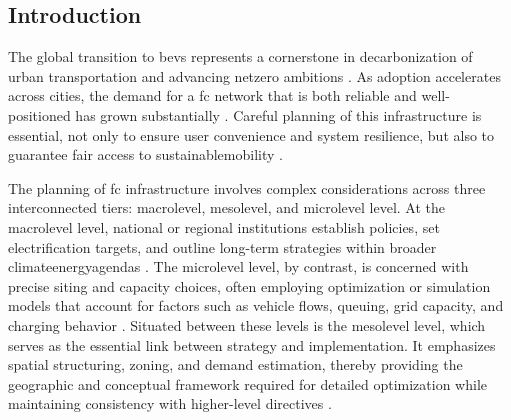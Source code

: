 \subsection{Introduction}
The global transition to \glspl{bev} represents a cornerstone in \gls{decarbonization} of urban transportation and advancing \gls{netzero} ambitions \cite{IEA2023GlobalEVOutlook}. As adoption accelerates across cities, the demand for a \gls{fc} network that is both reliable and well-positioned has grown substantially \cite{Ghosh2022}. Careful planning of this infrastructure is essential, not only to ensure user convenience and system resilience, but also to guarantee fair access to \gls{sustainablemobility} \cite{Cai2024}.


The planning of \gls{fc} infrastructure involves complex considerations across three interconnected tiers: \gls{macrolevel}, \gls{mesolevel}, and \gls{microlevel} level. At the \gls{macrolevel} level, national or regional institutions establish policies, set electrification targets, and outline long-term strategies within broader \gls{climateenergyagendas} \cite{Luo2024}. The \gls{microlevel} level, by contrast, is concerned with precise siting and capacity choices, often employing optimization or simulation models that account for factors such as vehicle flows, queuing, grid capacity, and charging behavior \cite{Metais2022}. Situated between these levels is the \gls{mesolevel} level, which serves as the essential link between strategy and implementation. It emphasizes spatial structuring, zoning, and demand estimation, thereby providing the geographic and conceptual framework required for detailed optimization while maintaining consistency with higher-level directives \cite{Luo2024}.

